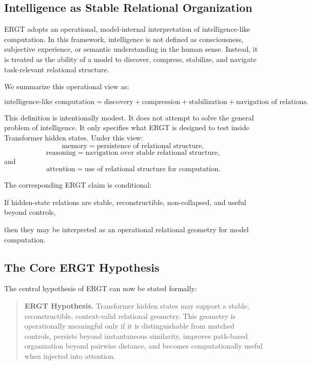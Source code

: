 \documentclass[11pt]{article}
\begin{document}
\subsection{Intelligence as Stable Relational Organization}

ERGT adopts an operational, model-internal interpretation of intelligence-like computation. In this framework, intelligence is not defined as consciousness, subjective experience, or semantic understanding in the human sense. Instead, it is treated as the ability of a model to discover, compress, stabilize, and navigate task-relevant relational structure.

We summarize this operational view as:
\begin{ergtclaim}
\[
\text{intelligence-like computation}
=
\text{discovery}
+
\text{compression}
+
\text{stabilization}
+
\text{navigation of relations}.
\]
\end{ergtclaim}

This definition is intentionally modest. It does not attempt to solve the general problem of intelligence. It only specifies what ERGT is designed to test inside Transformer hidden states. Under this view:
\[
\text{memory}
=
\text{persistence of relational structure},
\]
\[
\text{reasoning}
=
\text{navigation over stable relational structure},
\]
and
\[
\text{attention}
=
\text{use of relational structure for computation}.
\]

The corresponding ERGT claim is conditional:
\begin{ergtclaim}
If hidden-state relations are stable, reconstructible, non-collapsed, and useful beyond controls,
\end{ergtclaim}
\begin{ergtclaim}
then they may be interpreted as an operational relational geometry for model computation.
\end{ergtclaim}

\subsection{The Core ERGT Hypothesis}

The central hypothesis of ERGT can now be stated formally:

\begin{quote}
\textbf{ERGT Hypothesis.}
Transformer hidden states may support a stable, reconstructible, context-valid relational geometry. This geometry is operationally meaningful only if it is distinguishable from matched controls, persists beyond instantaneous similarity, improves path-based organization beyond pairwise distance, and becomes computationally useful when injected into attention.
\end{quote}
\end{document}

